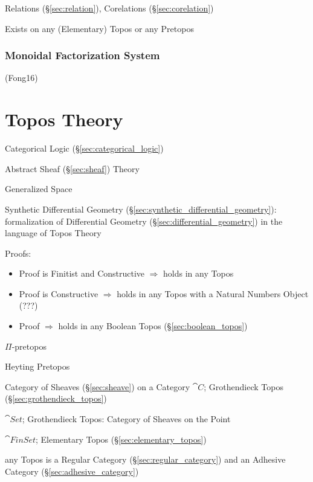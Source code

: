 Relations (\S\ref{sec:relation}), Corelations (\S\ref{sec:corelation})

Exists on any (Elementary) Topos or any Pretopos %



\subsubsection{Monoidal Factorization System}
\label{sec:monoidal_factorization_system}

(Fong16)



\section{Topos Theory}\label{sec:topos_theory}

Categorical Logic (\S\ref{sec:categorical_logic})

Abstract Sheaf (\S\ref{sec:sheaf}) Theory

Generalized Space

\fist Synthetic Differential Geometry
(\S\ref{sec:synthetic_differential_geometry}): formalization of Differential
Geometry (\S\ref{sec:differential_geometry}) in the language of Topos Theory

Proofs:
\begin{itemize}
  \item Proof is Finitist and Constructive $\Rightarrow$ holds in any
    Topos
  \item Proof is Constructive $\Rightarrow$ holds in any Topos with a
    Natural Numbers Object (???)
  \item Proof $\Rightarrow$ holds in any Boolean Topos
    (\S\ref{sec:boolean_topos})
\end{itemize}

$\Pi$-pretopos

Heyting Pretopos

Category of Sheaves (\S\ref{sec:sheave}) on a Category $\cat{C}$;
Grothendieck Topos (\S\ref{sec:grothendieck_topos})

$\cat{Set}$; Grothendieck Topos: Category of Sheaves on the Point

$\cat{FinSet}$; Elementary Topos (\S\ref{sec:elementary_topos})

any Topos is a Regular Category (\S\ref{sec:regular_category}) and an
Adhesive Category (\S\ref{sec:adhesive_category})



